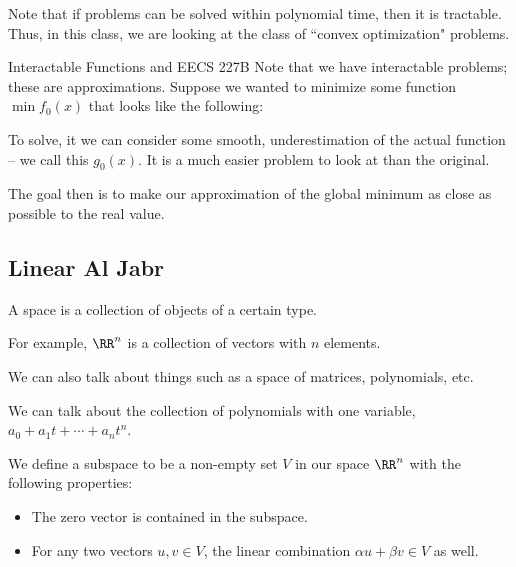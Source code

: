 \documentclass[openany]{book}
\begin{document}
\begin{warn}
	Note that if problems can be solved within polynomial time, then it is tractable. Thus, in this class, we are looking at the class of ``convex optimization" problems.
\end{warn}

\begin{miscbox}{Interactable Functions and EECS 227B}
	Note that we have interactable problems; these are approximations. Suppose we wanted to minimize some function $\min f_0(x)$ that looks like the following:

	To solve, it we can consider some smooth, underestimation of the actual function -- we call this $g_0(x)$. It is a much easier problem to look at than the original.
	
	The goal then is to make our approximation of the global minimum as close as possible to the real value.
\end{miscbox}

\subsection{Linear Al Jabr}
\begin{defn}[Space]
	A space is a collection of objects of a certain type.
\end{defn}

\begin{example}[$\RR^{n}$]
	For example, $\RR^{n}$ is a collection of vectors with $n$ elements.
\end{example}

We can also talk about things such as a space of matrices, polynomials, etc.
\begin{example}[$\mathscr{P}$]
	We can talk about the collection of polynomials with one variable, $a_0 + a_1t + \cdots + a_nt^{n}$.
\end{example}

\begin{defn}[Subspace]
	We define a subspace to be a non-empty set $V$ in our space $\RR^{n}$ with the following properties:
	\begin{itemize}
		\item The zero vector is contained in the subspace.
		\item For any two vectors $u, v \in V$, the linear combination $\alpha u + \beta v \in V$ as well.
	\end{itemize}
\end{defn}
\end{document}
